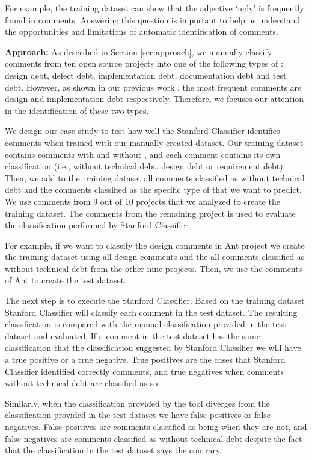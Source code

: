 For example, the training dataset can show that the adjective `ugly' is frequently found in \SATD comments. Answering this question is important to help us understand the opportunities and limitations of automatic identification of \SATD comments. 

\vspace{1mm}
\noindent \textbf{Approach:} As described in Section \ref{sec:approach}, we manually classify comments from ten open source projects into one of the following types of \SATD: design debt, defect debt, implementation debt, documentation debt and test debt. However, as shown in our previous work \cite{Maldonado2015MTD}, the most frequent \SATD comments are design and implementation debt respectively. Therefore, we focuses our attention in the identification of these two \SATD types. 

We design our case study to test how well the Stanford Classifier identifies \SATD comments when trained with our manually created dataset. Our training dataset contains comments with and without \SATD, and each comment contains its own classification (i.e., without technical debt, design debt or requirement debt). Then, we add to the training dataset all comments classified as without technical debt and the comments classified as the specific type of \SATD that we want to predict. We use comments from 9 out of 10 projects that we analyzed to create the training dataset. The comments from the remaining project is used to evaluate the classification performed by Stanford Classifier.

For example, if we want to classify the design \SATD comments in Ant project we create the training dataset using all design \SATD comments and the all comments classified as without technical debt from the other nine projects. Then, we use the comments of Ant to create the test dataset. 

The next step is to execute the Stanford Classifier. Based on the training dataset Stanford Classifier will classify each comment in the test dataset. The resulting classification is compared with the manual classification provided in the test dataset and evaluated. If a comment in the test dataset has the same classification that the classification suggested by Stanford Classifier we will have a true positive or a true negative. True positives are the cases that Stanford Classifier identified correctly \SATD comments, and true negatives when comments without technical debt are classified as so. 

Similarly, when the classification provided by the tool diverges from the classification provided in the test dataset we have false positives or false negatives. False positives are comments classified as being \SATD when they are not, and false negatives are comments classified as without technical debt despite the fact that the classification in the test dataset says the contrary.

